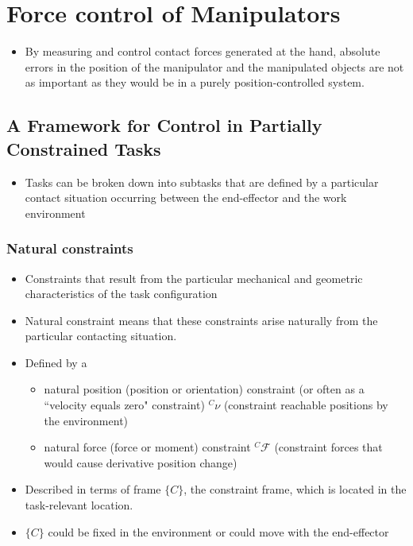 \documentclass[10pt,a4paper]{article}
\begin{document}
\section{Force control of Manipulators}
\begin{itemize}
	\item By measuring and control contact forces generated at the hand, absolute errors in the position of the manipulator and the manipulated objects are not as important as they would be in a purely position-controlled system.
\end{itemize}
\subsection{A Framework for Control in Partially Constrained Tasks}
\begin{itemize}
	\item Tasks can be broken down into subtasks that are defined by a particular contact situation occurring between the end-effector and the work environment
\end{itemize}

\subsubsection{Natural constraints}
\begin{itemize}
	\item Constraints that result from the particular mechanical and geometric characteristics of the task configuration
	\item Natural constraint means that these constraints arise naturally from the particular contacting situation.
	\item Defined by a
	\begin{itemize}
		\item natural position (position or orientation) constraint (or often as a ``velocity equals zero" constraint) $^C\nu$ (constraint reachable positions by the environment)
		\item natural force (force or moment) constraint $^C\mathcal{F}$ (constraint forces that would cause derivative position change)
	\end{itemize}
	\item Described in terms of frame $\{C\}$, the constraint frame, which is located in the task-relevant location.
	\item $\{C\}$ could be fixed in the environment or could move with the end-effector
\end{itemize}
\end{document}
